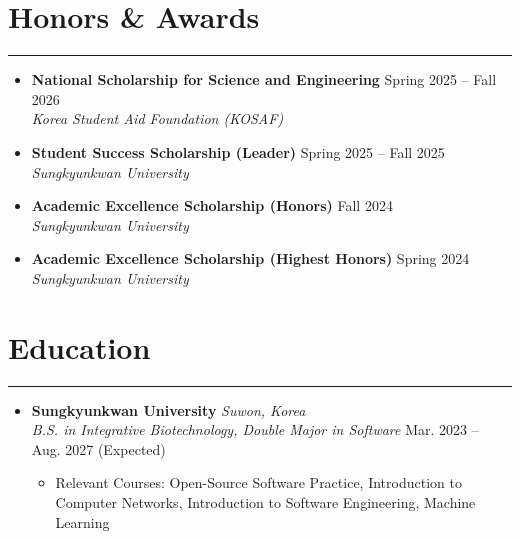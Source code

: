 \documentclass[letterpaper, 10pt]{article}
\begin{document}
\section*{Honors \& Awards}
\hrule
\vspace{4pt}
\begin{itemize}
    \item[] \textbf{National Scholarship for Science and Engineering} \hfill Spring 2025 -- Fall 2026 \\
            \textit{Korea Student Aid Foundation (KOSAF)}
    \item[] \textbf{Student Success Scholarship (Leader)} \hfill Spring 2025 -- Fall 2025 \\
            \textit{Sungkyunkwan University}
    \item[] \textbf{Academic Excellence Scholarship (Honors)} \hfill Fall 2024 \\
            \textit{Sungkyunkwan University}
    \item[] \textbf{Academic Excellence Scholarship (Highest Honors)} \hfill Spring 2024 \\
            \textit{Sungkyunkwan University}
\end{itemize}

\section*{Education}
\hrule
\vspace{4pt}
\begin{itemize}
    \item[]
        \textbf{Sungkyunkwan University} \hfill \textit{Suwon, Korea} \\
        \textit{B.S. in Integrative Biotechnology, Double Major in Software} \hfill Mar. 2023 -- Aug. 2027 (Expected)
        \begin{itemize}
            \item Relevant Courses: Open-Source Software Practice, Introduction to Computer Networks, Introduction to Software Engineering, Machine Learning
        \end{itemize}
\end{itemize}

\end{document}
